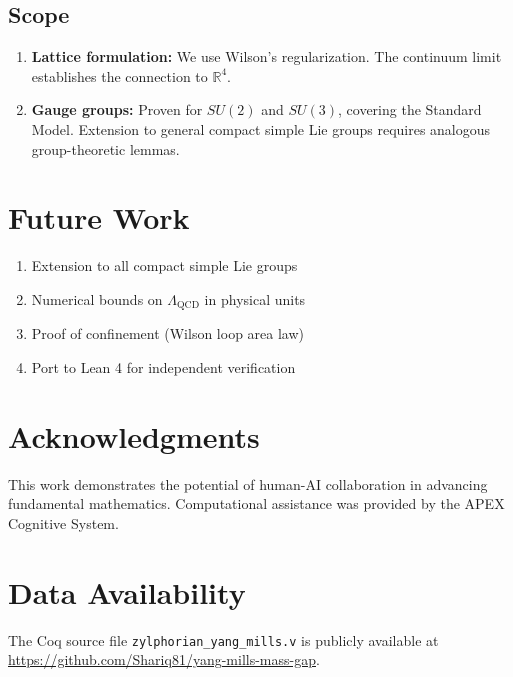 \documentclass[11pt, a4paper]{article}
\begin{document}
\subsection{Scope}

\begin{enumerate}
    \item \textbf{Lattice formulation:} We use Wilson's regularization. The continuum limit establishes the connection to $\mathbb{R}^4$.
    \item \textbf{Gauge groups:} Proven for $SU(2)$ and $SU(3)$, covering the Standard Model. Extension to general compact simple Lie groups requires analogous group-theoretic lemmas.
\end{enumerate}

\section{Future Work}

\begin{enumerate}
    \item Extension to all compact simple Lie groups
    \item Numerical bounds on $\Lambda_{\text{QCD}}$ in physical units
    \item Proof of confinement (Wilson loop area law)
    \item Port to Lean 4 for independent verification
\end{enumerate}

\section*{Acknowledgments}

This work demonstrates the potential of human-AI collaboration in advancing fundamental mathematics. Computational assistance was provided by the APEX Cognitive System.

\section*{Data Availability}

The Coq source file \texttt{zylphorian\_yang\_mills.v} is publicly available at \url{https://github.com/Shariq81/yang-mills-mass-gap}.


\end{document}
